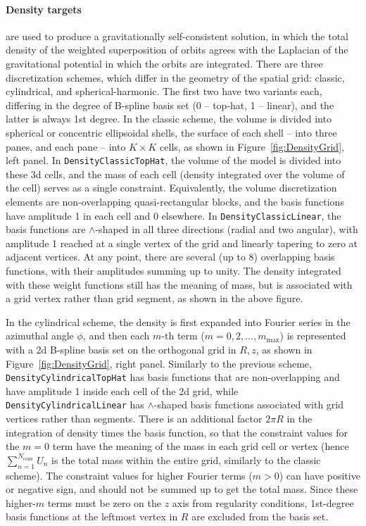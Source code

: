 \documentclass[12pt]{article}
\newcommand{\ppp}[1]{\textcolor{darkolive} {\texttt{#1}}}
\begin{document}
\paragraph{Density targets} are used to produce a gravitationally self-consistent solution, in which the total density of the weighted superposition of orbits agrees with the Laplacian of the gravitational potential in which the orbits are integrated.
There are three discretization schemes, which differ in the geometry of the spatial grid: classic, cylindrical, and spherical-harmonic. The first two have two variants each, differing in the degree of B-spline basis set (0 -- top-hat, 1 -- linear), and the latter is always 1st degree. 
In the classic scheme, the volume is divided into spherical or concentric ellipsoidal shells, the surface of each shell -- into three panes, and each pane -- into $K\times K$ cells, as shown in Figure~\ref{fig:DensityGrid}, left panel. In \ppp{DensityClassicTopHat}, the volume of the model is divided into these 3d cells, and the mass of each cell (density integrated over the volume of the cell) serves as a single constraint. Equivalently, the volume discretization elements are non-overlapping quasi-rectangular blocks, and the basis functions have amplitude 1 in each cell and 0 elsewhere. In \ppp{DensityClassicLinear}, the basis functions are $\wedge$-shaped in all three directions (radial and two angular), with amplitude 1 reached at a single vertex of the grid and linearly tapering to zero at adjacent vertices. At any point, there are several (up to 8) overlapping basis functions, with their amplitudes summing up to unity. The density integrated with these weight functions still has the meaning of mass, but is associated with a grid vertex rather than grid segment, as shown in the above figure.

In the cylindrical scheme, the density is first expanded into Fourier series in the azimuthal angle $\phi$, and then each $m$-th term ($m=0, 2, \dots, m_\mathrm{max}$) is represented with a 2d B-spline basis set on the orthogonal grid in $R,z$, as shown in Figure~\ref{fig:DensityGrid}, right panel. Similarly to the previous scheme, \ppp{DensityCylindricalTopHat} has basis functions that are non-overlapping and have amplitude 1 inside each cell of the 2d grid, while \ppp{DensityCylindricalLinear} has $\wedge$-shaped basis functions associated with grid vertices rather than segments. There is an additional factor $2\pi R$ in the integration of density times the basis function, so that the constraint values for the $m=0$ term have the meaning of the mass in each grid cell or vertex (hence $\sum_{n=1}^{N_\mathrm{cons}} U_n$ is the total mass within the entire grid, similarly to the classic scheme). The constraint values for higher Fourier terms ($m>0$) can have positive or negative sign, and should not be summed up to get the total mass. Since these higher-$m$ terms must be zero on the $z$ axis from regularity conditions, 1st-degree basis functions at the leftmost vertex in $R$ are excluded from the basis set.
\end{document}
